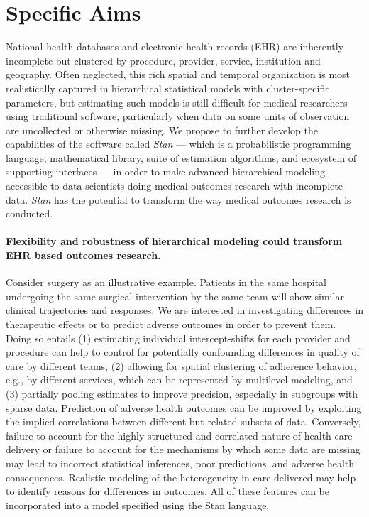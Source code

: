 \documentclass[11pt,notitlepage]{article}
\begin{document}
\section*{Specific Aims}
National health databases and electronic health records (EHR) are inherently incomplete but
clustered by procedure, provider, service, institution and geography. Often 
neglected, this rich spatial and temporal organization is most realistically 
captured in hierarchical statistical models with cluster-specific parameters, but 
estimating such models is still difficult for medical researchers using traditional software,
particularly when data on some units of observation are uncollected or otherwise missing.
We propose to further develop the capabilities of the software called \textit{Stan} --- 
which is a probabilistic programming language, mathematical library, suite of estimation
algorithms, and ecosystem of supporting interfaces --- in order to make advanced hierarchical  
modeling accessible to data scientists doing medical outcomes research with incomplete data.
\textit{Stan} has the potential to transform the way medical outcomes research is conducted.

\paragraph*{Flexibility and robustness of hierarchical modeling could 
transform EHR based outcomes research.} Consider surgery as an 
illustrative example. Patients in the same hospital undergoing the 
same surgical intervention by the same team will show similar clinical 
trajectories and responses. We are interested in investigating
differences in therapeutic effects or to predict adverse outcomes in order to prevent 
them. Doing so entails (1) estimating individual intercept-shifts for each provider and procedure
can help to control for potentially confounding differences 
in quality of care by different teams, (2) allowing for spatial clustering of adherence 
behavior, e.g., by different services, which can be represented by multilevel modeling, and
(3) partially pooling estimates to improve precision, especially in subgroups with sparse data.
Prediction of adverse health outcomes can be improved by exploiting the implied correlations between different but related subsets of data. 
Conversely, failure to account for the highly structured and correlated nature of health care delivery or
failure to account for the mechanisms by which some data are missing may lead 
to incorrect statistical inferences, poor predictions, and adverse health consequences. 
Realistic modeling of the heterogeneity in  care delivered may help to identify reasons for differences in outcomes.
All of these features can be incorporated into a model specified using the Stan language.
\end{document}
